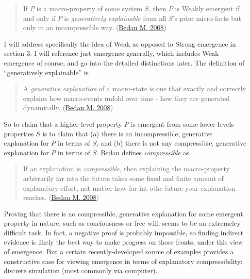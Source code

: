 \documentclass{article}
\newcommand{\ti}[1]{\textit{#1}}
\renewcommand{\cite}[1]{\hyperlink{#1}{#1}}
\begin{document}
\begin{quote}
If $P$ is a macro-property of some system $S$, then $P$ is Weakly emergent if and only if $P$ is \ti{generatively explainable} from all $S$'s prior micro-facts but only in an incompressible way.
(\cite{Bedau M. 2008})
\end{quote}

I will address specifically the idea of Weak as opposed to Strong emergence in section 3. 
I will reference just emergence generally, which includes Weak emergence of course, and go into the detailed distinctions later. The definition of ``generatively explainable'' is

\begin{quote}
A \ti{generative explanation} of a macro-state is one that exactly and correctly explains how macro-events unfold over time - how they are generated dynamically.
(\cite{Bedau M. 2008})
\end{quote}

So to claim that a higher-level property $P$ is emergent from some lower levels properties $S$ is to claim that (a) there is an incompressible, generative explanation for $P$ in terms of $S$, and (b) there is not any compressible, generative explanation for $P$ in terms of $S$. Bedau defines \ti{compressible} as

\begin{quote}
If an explanation is \ti{compressible}, then explaining the macro-property arbitrarily far into the future takes some fixed and finite amount of explanatory effort, not matter how far int othe future your explanation reaches.
(\cite{Bedau M. 2008})
\end{quote}

Proving that there is no compressible, generative explanation for some emergent property in nature, such as conciousness or free will, seems to be an extremeley difficult task. In fact, a negative proof is probably impossible, so finding indirect evidence is likely the best way to make progress on those fronts, under this view of emergence. But a certain recently-developed source of examples provides a constructive case for viewing emergence in terms of explanatory compressibility: discrete simulation (most commonly via computer).


\end{document}
